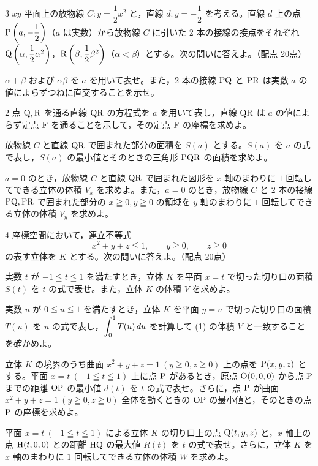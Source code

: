 \begin{monsheet}
\begin{daimon}{3}
$xy$ 平面上の放物線 $C: y=\dfrac{1}{2}x^{2}$ と，直線 $d: y=-\dfrac{1}{2}$ を考える。直線 $d$ 上の点 $\mathrm{P}\left(a, -\dfrac{1}{2}\right)$（$a$ は実数）から放物線 $C$ に引いた $2$ 本の接線の接点をそれぞれ $\mathrm{Q}\left(\alpha, \dfrac{1}{2}\alpha^{2}\right)$，$\mathrm{R}\left(\beta, \dfrac{1}{2}\beta^{2}\right)$（$\alpha<\beta$）とする。次の問いに答えよ。\hfill（配点 20点）
\begin{shomon}
  \item $\alpha+\beta$ および $\alpha\beta$ を $a$ を用いて表せ。また，$2$ 本の接線 $\mathrm{PQ}$ と $\mathrm{PR}$ は実数 $a$ の値によらずつねに直交することを示せ。
  \item $2$ 点 $\mathrm{Q}, \mathrm{R}$ を通る直線 $\mathrm{QR}$ の方程式を $a$ を用いて表し，直線 $\mathrm{QR}$ は $a$ の値によらず定点 $\mathrm{F}$ を通ることを示して，その定点 $\mathrm{F}$ の座標を求めよ。
  \item 放物線 $C$ と直線 $\mathrm{QR}$ で囲まれた部分の面積を $S(a)$ とする。$S(a)$ を $a$ の式で表し，$S(a)$ の最小値とそのときの三角形 $\mathrm{PQR}$ の面積を求めよ。
  \item $a=0$ のとき，放物線 $C$ と直線 $\mathrm{QR}$ で囲まれた図形を $x$ 軸のまわりに $1$ 回転してできる立体の体積 $V_{x}$ を求めよ。また，$a=0$ のとき，放物線 $C$ と $2$ 本の接線 $\mathrm{PQ}, \mathrm{PR}$ で囲まれた部分の $x\geqq 0, y\geqq 0$ の領域を $y$ 軸のまわりに $1$ 回転してできる立体の体積 $V_{y}$ を求めよ。
\end{shomon}
\end{daimon}

\clearpage

\begin{daimon}{4}
座標空間において，連立不等式
\[
  x^{2} + y + z \leqq 1,\qquad y \geqq 0,\qquad z \geqq 0
\]
の表す立体を $K$ とする。次の問いに答えよ。\hfill（配点 20点）
\begin{shomon}
  \item 実数 $t$ が $-1\leqq t\leqq 1$ を満たすとき，立体 $K$ を平面 $x=t$ で切った切り口の面積 $S(t)$ を $t$ の式で表せ。また，立体 $K$ の体積 $V$ を求めよ。
  \item 実数 $u$ が $0\leqq u\leqq 1$ を満たすとき，立体 $K$ を平面 $y=u$ で切った切り口の面積 $T(u)$ を $u$ の式で表し，$\displaystyle\int_{0}^{1}T(u)\,du$ を計算して (1) の体積 $V$ と一致することを確かめよ。
  \item 立体 $K$ の境界のうち曲面 $x^{2}+y+z=1\ (y\geqq 0, z\geqq 0)$ 上の点を $\mathrm{P}(x, y, z)$ とする。平面 $x=t\ (-1\leqq t\leqq 1)$ 上に点 $\mathrm{P}$ があるとき，原点 $\mathrm{O}(0,0,0)$ から点 $\mathrm{P}$ までの距離 $\mathrm{OP}$ の最小値 $d(t)$ を $t$ の式で表せ。さらに，点 $\mathrm{P}$ が曲面 $x^{2}+y+z=1\ (y\geqq 0, z\geqq 0)$ 全体を動くときの $\mathrm{OP}$ の最小値と，そのときの点 $\mathrm{P}$ の座標を求めよ。
  \item 平面 $x=t\ (-1\leqq t\leqq 1)$ による立体 $K$ の切り口上の点 $\mathrm{Q}(t, y, z)$ と，$x$ 軸上の点 $\mathrm{H}(t, 0, 0)$ との距離 $\mathrm{HQ}$ の最大値 $R(t)$ を $t$ の式で表せ。さらに，立体 $K$ を $x$ 軸のまわりに $1$ 回転してできる立体の体積 $W$ を求めよ。
\end{shomon}
\end{daimon}


\end{monsheet}

